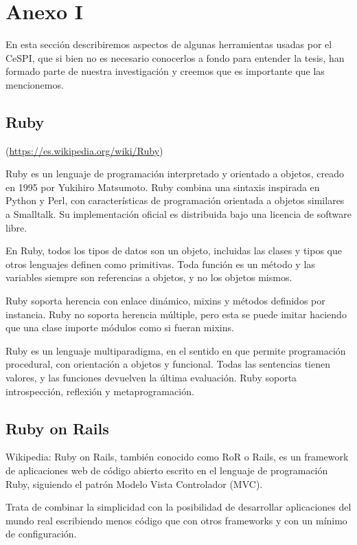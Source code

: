 \section{Anexo I}
\label{anexo:}

En esta sección describiremos aspectos de algunas herramientas usadas por el
CeSPI, que si bien no es necesario conocerlos a fondo para entender la tesis,
han formado parte de nuestra investigación y creemos que es importante que las
mencionemos.

\subsection{Ruby}
(\url{https://es.wikipedia.org/wiki/Ruby})

Ruby es un lenguaje de programación interpretado y orientado a objetos, creado
en 1995 por Yukihiro Matsumoto. Ruby combina una sintaxis inspirada en Python y
Perl, con características de programación orientada a objetos similares a
Smalltalk. Su implementación oficial es distribuida bajo una licencia de
software libre.

En Ruby, todos los tipos de datos son un objeto, incluidas las clases y tipos
que otros lenguajes definen como primitivas. Toda función es un método y las
variables siempre son referencias a objetos, y no los objetos mismos.

Ruby soporta herencia con enlace dinámico, mixins y métodos definidos por
instancia. Ruby no soporta herencia múltiple, pero esta se puede imitar
haciendo que una clase importe módulos como si fueran mixins. 

Ruby es un lenguaje multiparadigma, en el sentido en que permite programación
procedural, con orientación a objetos y funcional. Todas las sentencias tienen
valores, y las funciones devuelven la última evaluación. Ruby soporta
introspección, reflexión y metaprogramación.

\subsection{Ruby on Rails}

Wikipedia:
Ruby on Rails, también conocido como RoR o Rails, es un framework de
aplicaciones web de código abierto escrito en el lenguaje de programación Ruby,
siguiendo el patrón Modelo Vista Controlador (MVC).

Trata de combinar la simplicidad con la posibilidad de desarrollar aplicaciones
del mundo real escribiendo menos código que con otros frameworks y con un
mínimo de configuración.

